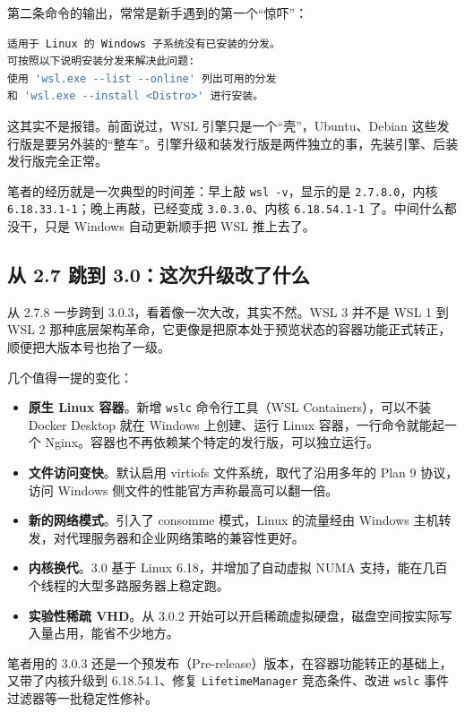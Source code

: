 \documentclass[12pt,a4paper]{ctexbook}
\begin{document}
第二条命令的输出，常常是新手遇到的第一个``惊吓''：

\begin{lstlisting}[language=bash,title={什么都没装时的提示}]
适用于 Linux 的 Windows 子系统没有已安装的分发。
可按照以下说明安装分发来解决此问题:
使用 'wsl.exe --list --online' 列出可用的分发
和 'wsl.exe --install <Distro>' 进行安装。
\end{lstlisting}

这其实不是报错。前面说过，WSL 引擎只是一个``壳''，Ubuntu、Debian 这些发行版是要另外装的``整车''。引擎升级和装发行版是两件独立的事，先装引擎、后装发行版完全正常。

笔者的经历就是一次典型的时间差：早上敲 \texttt{wsl -v}，显示的是 \texttt{2.7.8.0}，内核 \texttt{6.18.33.1-1}；晚上再敲，已经变成 \texttt{3.0.3.0}、内核 \texttt{6.18.54.1-1} 了。中间什么都没干，只是 Windows 自动更新顺手把 WSL 推上去了。

\subsection{从 2.7 跳到 3.0：这次升级改了什么}

从 2.7.8 一步跨到 3.0.3，看着像一次大改，其实不然。WSL 3 并不是 WSL 1 到 WSL 2 那种底层架构革命，它更像是把原本处于预览状态的容器功能正式转正，顺便把大版本号也抬了一级。

几个值得一提的变化：

\begin{itemize}
    \item \textbf{原生 Linux 容器}。新增 \verb|wslc| 命令行工具（WSL Containers），可以不装 Docker Desktop 就在 Windows 上创建、运行 Linux 容器，一行命令就能起一个 Nginx。容器也不再依赖某个特定的发行版，可以独立运行。
    \item \textbf{文件访问变快}。默认启用 virtiofs 文件系统，取代了沿用多年的 Plan 9 协议，访问 Windows 侧文件的性能官方声称最高可以翻一倍。
    \item \textbf{新的网络模式}。引入了 consomme 模式，Linux 的流量经由 Windows 主机转发，对代理服务器和企业网络策略的兼容性更好。
    \item \textbf{内核换代}。3.0 基于 Linux 6.18，并增加了自动虚拟 NUMA 支持，能在几百个线程的大型多路服务器上稳定跑。
    \item \textbf{实验性稀疏 VHD}。从 3.0.2 开始可以开启稀疏虚拟硬盘，磁盘空间按实际写入量占用，能省不少地方。
\end{itemize}

笔者用的 3.0.3 还是一个预发布（Pre-release）版本，在容器功能转正的基础上，又带了内核升级到 6.18.54.1、修复 \verb|LifetimeManager| 竞态条件、改进 \verb|wslc| 事件过滤器等一批稳定性修补。
\end{document}
